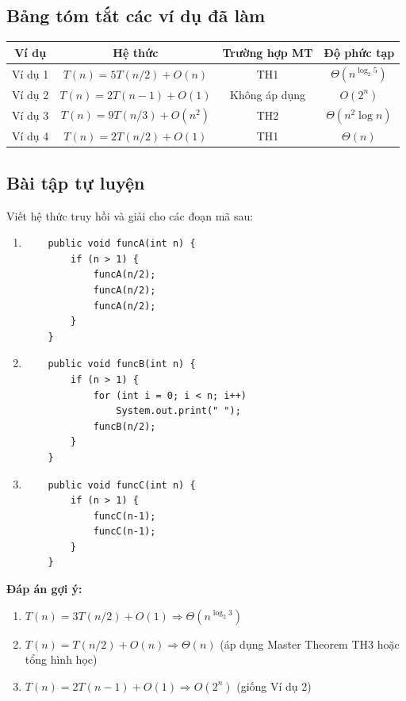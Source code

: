 \documentclass{article}
\begin{document}
\subsection{Bảng tóm tắt các ví dụ đã làm}

\begin{tabular}{|c|c|c|c|}
\hline
\textbf{Ví dụ} & \textbf{Hệ thức} & \textbf{Trường hợp MT} & \textbf{Độ phức tạp} \\
\hline
Ví dụ 1 & \(T(n) = 5T(n/2) + O(n)\) & TH1 & \(\Theta(n^{\log_2 5})\) \\
\hline
Ví dụ 2 & \(T(n) = 2T(n-1) + O(1)\) & Không áp dụng & \(O(2^n)\) \\
\hline
Ví dụ 3 & \(T(n) = 9T(n/3) + O(n^2)\) & TH2 & \(\Theta(n^2 \log n)\) \\
\hline
Ví dụ 4 & \(T(n) = 2T(n/2) + O(1)\) & TH1 & \(\Theta(n)\) \\
\hline
\end{tabular}

\subsection{Bài tập tự luyện}

Viết hệ thức truy hồi và giải cho các đoạn mã sau:

\begin{enumerate}
    \item
    \begin{verbatim}
    public void funcA(int n) {
        if (n > 1) {
            funcA(n/2);
            funcA(n/2);
            funcA(n/2);
        }
    }
    \end{verbatim}
    
    \item
    \begin{verbatim}
    public void funcB(int n) {
        if (n > 1) {
            for (int i = 0; i < n; i++)
                System.out.print(" ");
            funcB(n/2);
        }
    }
    \end{verbatim}
    
    \item
    \begin{verbatim}
    public void funcC(int n) {
        if (n > 1) {
            funcC(n-1);
            funcC(n-1);
        }
    }
    \end{verbatim}
\end{enumerate}

\textbf{Đáp án gợi ý:}
\begin{enumerate}
    \item \(T(n) = 3T(n/2) + O(1) \Rightarrow \Theta(n^{\log_2 3})\)
    \item \(T(n) = T(n/2) + O(n) \Rightarrow \Theta(n)\) (áp dụng Master Theorem TH3 hoặc tổng hình học)
    \item \(T(n) = 2T(n-1) + O(1) \Rightarrow O(2^n)\) (giống Ví dụ 2)
\end{enumerate}
\end{document}
